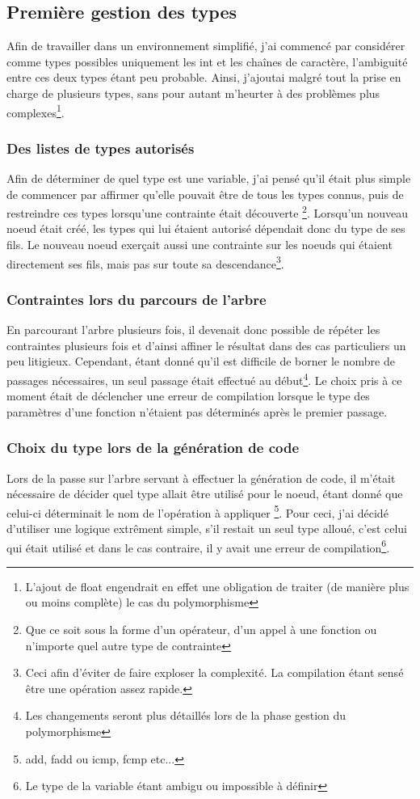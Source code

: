 \documentclass[12pt]{article}
\begin{document}
\subsection{Première gestion des types}
Afin de travailler dans un environnement simplifié, j'ai commencé par
considérer comme types possibles uniquement les int et les chaînes de
caractère, l'ambiguité entre ces deux types étant peu probable. Ainsi,
j'ajoutai malgré tout la prise en charge de plusieurs types, sans pour autant
m'heurter à des problèmes plus complexes\footnote{L'ajout de float engendrait
en effet une obligation de traiter (de manière plus ou moins complète) le cas
du polymorphisme}.

\subsubsection{Des listes de types autorisés}
Afin de déterminer de quel type est une variable, j'ai pensé qu'il était plus
simple de commencer par affirmer qu'elle pouvait être de tous les types
connus, puis de restreindre ces types lorsqu'une contrainte était découverte
\footnote{Que ce soit sous la forme d'un opérateur, d'un appel à une fonction
ou n'importe quel autre type de contrainte}. Lorsqu'un nouveau noeud était
créé, les types qui lui étaient autorisé dépendait donc du type de ses fils.
Le nouveau noeud exerçait aussi une contrainte sur les noeuds qui étaient
directement ses fils, mais pas sur toute sa descendance\footnote{Ceci afin
d'éviter de faire exploser la complexité. La compilation étant sensé être une
opération assez rapide.}.

\subsubsection{Contraintes lors du parcours de l'arbre}
En parcourant l'arbre plusieurs fois, il devenait donc possible de répéter
les contraintes plusieurs fois et d'ainsi affiner le résultat dans des cas
particuliers un peu litigieux. Cependant, étant donné qu'il est difficile
de borner le nombre de passages nécessaires, un seul passage était effectué
au début\footnote{Les changements seront plus détaillés lors de la phase
gestion du polymorphisme}. Le choix pris à ce moment était de déclencher une
erreur de compilation lorsque le type des paramètres d'une fonction n'étaient
pas déterminés après le premier passage.

\subsubsection{Choix du type lors de la génération de code}
Lors de la passe sur l'arbre servant à effectuer la génération de code,
il m'était nécessaire de décider quel type allait être utilisé pour le noeud,
étant donné que celui-ci déterminait le nom de l'opération à appliquer
\footnote{add, fadd ou icmp, fcmp etc...}. Pour ceci, j'ai décidé d'utiliser
une logique extrêment simple, s'il restait un seul type alloué, c'est celui
qui était utilisé et dans le cas contraire, il y avait une erreur de
compilation\footnote{Le type de la variable étant ambigu ou impossible
à définir}.
\end{document}
